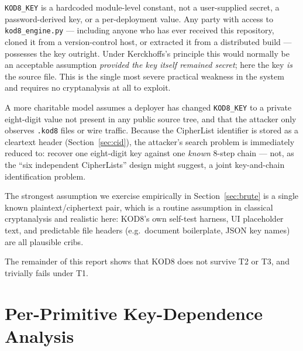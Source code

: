 \documentclass[11pt]{article}
\begin{document}
\begin{description}[leftmargin=1.4em, style=nextline]
  \item[\textbf{T1 — Source-available (white-box).}]
    \texttt{KOD8\_KEY} is a hardcoded module-level constant, not a
    user-supplied secret, a password-derived key, or a per-deployment
    value. Any party with access to \texttt{kod8\_engine.py} — including
    anyone who has ever received this repository, cloned it from a
    version-control host, or extracted it from a distributed build —
    possesses the key outright. Under Kerckhoffs's principle this would
    normally be an acceptable assumption \emph{provided the key itself
    remained secret}; here the key \emph{is} the source file. This is the
    single most severe practical weakness in the system and requires no
    cryptanalysis at all to exploit.
  \item[\textbf{T2 — Ciphertext-and-header-only, key rotated.}]
    A more charitable model assumes a deployer has changed
    \texttt{KOD8\_KEY} to a private eight-digit value not present in any
    public source tree, and that the attacker only observes
    \texttt{.kod8} files or wire traffic. Because the CipherList
    identifier is stored as a cleartext header (Section~\ref{sec:cid}),
    the attacker's search problem is immediately reduced to: recover one
    eight-digit key against one \emph{known} 8-step chain — not, as the
    ``six independent CipherLists'' design might suggest, a joint
    key-and-chain identification problem.
  \item[\textbf{T3 — Known-plaintext.}]
    The strongest assumption we exercise empirically in
    Section~\ref{sec:brute} is a single known plaintext/ciphertext pair,
    which is a routine assumption in classical cryptanalysis and
    realistic here: KOD8's own self-test harness, UI placeholder text,
    and predictable file headers (e.g.\ document boilerplate, JSON key
    names) are all plausible cribs.
\end{description}

The remainder of this report shows that KOD8 does not survive T2 or T3,
and trivially fails under T1.

\section{Per-Primitive Key-Dependence Analysis}
\label{sec:entropy}
\end{document}
